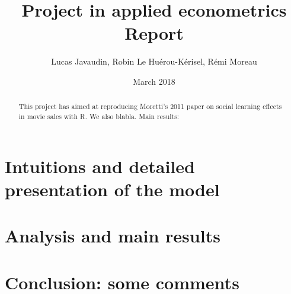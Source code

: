 \documentclass{article}
\title{Project in applied econometrics\\ Report}
\author{Lucas Javaudin, Robin Le Huérou-Kérisel, Rémi Moreau}
\date{March 2018}
\begin{document}
\maketitle

%
%
%
%
%
\begin{abstract}
	This project has aimed at reproducing Moretti's 2011 paper on social learning effects in movie sales with R. We also blabla. Main results:
\end{abstract}
\tableofcontents
\section{Intuitions and detailed presentation of the model}



\section{Analysis and main results}





\section{Conclusion: some comments}
\end{document}
